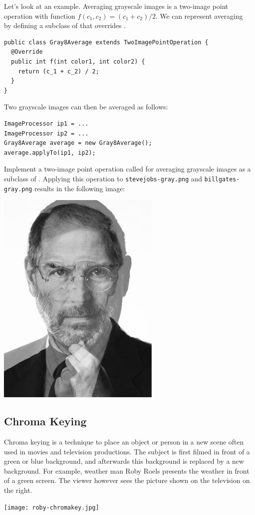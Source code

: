 \documentclass{book}
\begin{document}
Let's look at an example. Averaging grayscale images is a two-image point operation with function $f(c_1, c_2) = (c_1 + c_2) / 2$. We can represent averaging by defining a subclass of  that overrides . 
\begin{lstlisting}
public class Gray8Average extends TwoImagePointOperation {
  @Override  
  public int f(int color1, int color2) {
    return (c_1 + c_2) / 2;
  }
}
\end{lstlisting}
Two grayscale images can then be averaged as follows:
\begin{lstlisting}
ImageProcessor ip1 = ...
ImageProcessor ip2 = ...
Gray8Average average = new Gray8Average();
average.applyTo(ip1, ip2);
\end{lstlisting}

\begin{exercise}
Implement a two-image point operation called  for averaging grayscale images as a subclass of . Applying this operation to \texttt{stevejobs-gray.png} and \texttt{billgates-gray.png} results in the following image:
\begin{center}
\includegraphics[scale=0.2]{jobs-gates-average.png}
\end{center}
\end{exercise}

\subsection{Chroma Keying}
Chroma keying is a technique to place an object or person in a new scene often used in movies and television productions. The subject is first filmed in front of a green or blue background, and afterwards this background is replaced by a new background. For example, weather man Roby Roels presents the weather in front of a green screen. The viewer however sees the picture shown on the television on the right.
\begin{center}
\texttt{[image: roby-chromakey.jpg]}
\end{center}
\end{document}
